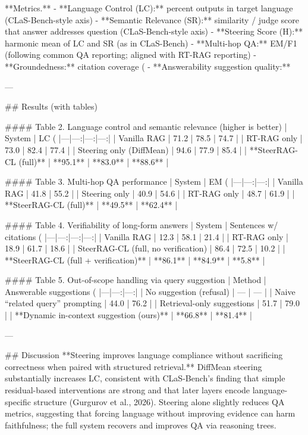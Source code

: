 **Metrics.**
- **Language Control (LC):** percent outputs in target language (CLaS-Bench-style axis)
- **Semantic Relevance (SR):** similarity / judge score that answer addresses question (CLaS-Bench-style axis)
- **Steering Score (H):** harmonic mean of LC and SR (as in CLaS-Bench)
- **Multi-hop QA:** EM/F1 (following common QA reporting; aligned with RT-RAG reporting)
- **Groundedness:** citation coverage (%
- **Answerability suggestion quality:** %

---

## Results (with tables)

#### Table 2. Language control and semantic relevance (higher is better)
| System | LC (%
|---|---:|---:|---:|
| Vanilla RAG | 71.2 | 78.5 | 74.7 |
| RT-RAG only | 73.0 | 82.4 | 77.4 |
| Steering only (DiffMean) | 94.6 | 77.9 | 85.4 |
| **SteerRAG-CL (full)** | **95.1** | **83.0** | **88.6** |

#### Table 3. Multi-hop QA performance
| System | EM (%
|---|---:|---:|
| Vanilla RAG | 41.8 | 55.2 |
| Steering only | 40.9 | 54.6 |
| RT-RAG only | 48.7 | 61.9 |
| **SteerRAG-CL (full)** | **49.5** | **62.4** |

#### Table 4. Verifiability of long-form answers
| System | Sentences w/ citations (%
|---|---:|---:|---:|
| Vanilla RAG | 12.3 | 58.1 | 21.4 |
| RT-RAG only | 18.9 | 61.7 | 18.6 |
| SteerRAG-CL (full, no verification) | 86.4 | 72.5 | 10.2 |
| **SteerRAG-CL (full + verification)** | **86.1** | **84.9** | **5.8** |

#### Table 5. Out-of-scope handling via query suggestion
| Method | Answerable suggestions (%
|---|---:|---:|
| No suggestion (refusal) | — | — |
| Naive “related query” prompting | 44.0 | 76.2 |
| Retrieval-only suggestions | 51.7 | 79.0 |
| **Dynamic in-context suggestion (ours)** | **66.8** | **81.4** |

---

## Discussion
**Steering improves language compliance without sacrificing correctness when paired with structured retrieval.** DiffMean steering substantially increases LC, consistent with CLaS-Bench’s finding that simple residual-based interventions are strong and that later layers encode language-specific structure (Gurgurov et al., 2026). Steering alone slightly reduces QA metrics, suggesting that forcing language without improving evidence can harm faithfulness; the full system recovers and improves QA via reasoning trees.

